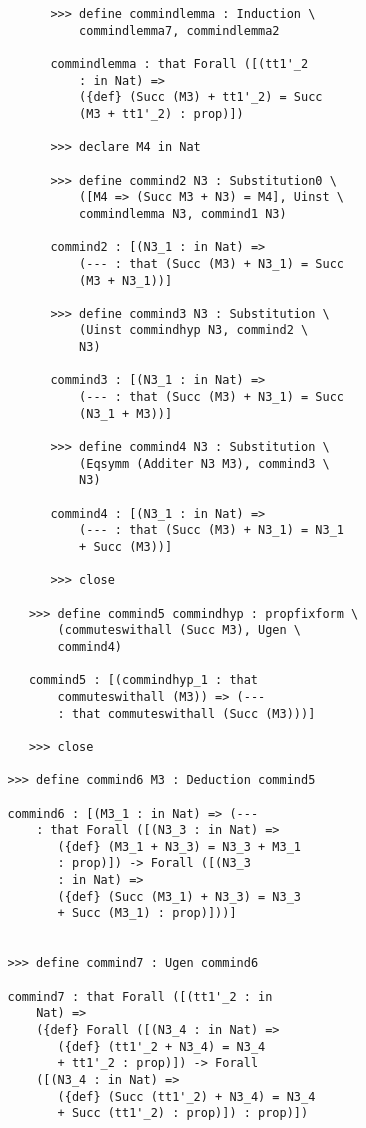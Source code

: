 \documentclass[12pt]{article}
\begin{document}
\begin{verbatim}
         >>> define commindlemma : Induction \
             commindlemma7, commindlemma2

         commindlemma : that Forall ([(tt1'_2 
             : in Nat) => 
             ({def} (Succ (M3) + tt1'_2) = Succ 
             (M3 + tt1'_2) : prop)])

         >>> declare M4 in Nat

         >>> define commind2 N3 : Substitution0 \
             ([M4 => (Succ M3 + N3) = M4], Uinst \
             commindlemma N3, commind1 N3)

         commind2 : [(N3_1 : in Nat) => 
             (--- : that (Succ (M3) + N3_1) = Succ 
             (M3 + N3_1))]

         >>> define commind3 N3 : Substitution \
             (Uinst commindhyp N3, commind2 \
             N3)

         commind3 : [(N3_1 : in Nat) => 
             (--- : that (Succ (M3) + N3_1) = Succ 
             (N3_1 + M3))]

         >>> define commind4 N3 : Substitution \
             (Eqsymm (Additer N3 M3), commind3 \
             N3)

         commind4 : [(N3_1 : in Nat) =>
             (--- : that (Succ (M3) + N3_1) = N3_1 
             + Succ (M3))]

         >>> close

      >>> define commind5 commindhyp : propfixform \
          (commuteswithall (Succ M3), Ugen \
          commind4)

      commind5 : [(commindhyp_1 : that 
          commuteswithall (M3)) => (--- 
          : that commuteswithall (Succ (M3)))]

      >>> close

   >>> define commind6 M3 : Deduction commind5

   commind6 : [(M3_1 : in Nat) => (--- 
       : that Forall ([(N3_3 : in Nat) => 
          ({def} (M3_1 + N3_3) = N3_3 + M3_1 
          : prop)]) -> Forall ([(N3_3 
          : in Nat) => 
          ({def} (Succ (M3_1) + N3_3) = N3_3 
          + Succ (M3_1) : prop)]))]


   >>> define commind7 : Ugen commind6

   commind7 : that Forall ([(tt1'_2 : in 
       Nat) => 
       ({def} Forall ([(N3_4 : in Nat) => 
          ({def} (tt1'_2 + N3_4) = N3_4 
          + tt1'_2 : prop)]) -> Forall 
       ([(N3_4 : in Nat) => 
          ({def} (Succ (tt1'_2) + N3_4) = N3_4 
          + Succ (tt1'_2) : prop)]) : prop)])



\end{verbatim}
\end{document}
